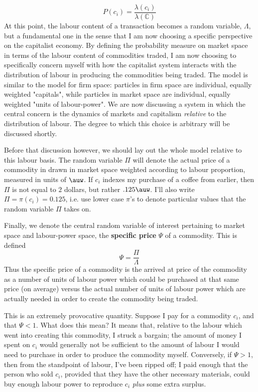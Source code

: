 \documentclass{article}
\theoremstyle{definition}
\theoremstyle{plain}
\theoremstyle{theorem}
\begin{document}
\[ P(c_i) = \frac{\lambda(c_i)}{\lambda(\mathbb{C})} \]
At this point, the labour content of a transaction becomes a random variable, $\Lambda$, but a fundamental one in the sense that I am now choosing a specific perspective on the capitalist economy. By defining the probability measure on market space in terms of the labour content of commodities traded, I am now choosing to specifically concern myself with how the capitalist system interacts with the distribution of labour in producing the commodities being traded. The model is similar to the model for firm space: particles in firm space are individual, equally weighted "capitals", while particles in market space are individual, equally weighted "units of labour-power". We are now discussing a system in which the central concern is the dynamics of markets and capitalism \textit{relative} to the distribution of labour. The degree to which this choice is arbitrary will be discussed shortly. \par 
Before that discussion however, we should lay out the whole model relative to this labour basis. The random variable $\Pi$ will denote the actual price of a commodity in drawn in market space weighted according to labour proportion, measured in units of $\auw$. If $c_i$  indexes my purchase of a coffee from earlier, then $\Pi$ is not equal to $2$ dollars, but rather $.125 \auw$. I'll also write $\Pi = \pi(c_i) = 0.125$, i.e. use lower case $\pi$'s to denote particular values that the random variable $\Pi$ takes on. \par 
Finally, we denote the central random variable of interest pertaining to market space and labour-power space, the \textbf{specific price} $\Psi$ of a commodity. This is defined
\[ \Psi = \frac{\Pi}{\Lambda} \]
Thus the specific price of a commodity is the arrived at price of the commodity as a number of units of labour power which could be purchased at that same price (on average) versus the actual number of units of labour power which are actually needed in order to create the commodity being traded. \par 
This is an extremely provocative quantity. Suppose I pay for a commodity $c_i$, and that $\Psi < 1$. What does this mean? It means that, relative to the labour which went into creating this commodity, I struck a bargain; the amount of money I spent on $c_i$ would generally not be sufficient to the amount of labour I would need to purchase in order to produce the commodity myself. Conversely, if $\Psi > 1$, then from the standpoint of labour, I've been ripped off; I paid enough that the person who sold $c_i$, provided that they have the other necessary materials, could buy enough labour power to reproduce $c_i$ \textit{plus} some extra surplus. \par 
\end{document}
